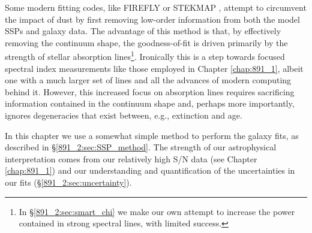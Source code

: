Some modern fitting codes, like FIREFLY \citep{Wilkinson15} or STEKMAP
\citep{Ocvirk06}, attempt to circumvent the impact of dust by first
removing low-order information from both the model SSPs and galaxy
data. The advantage of this method is that, by effectively removing
the continuum shape, the goodness-of-fit is driven primarily by the
strength of stellar absorption lines\footnote{ In
  \S\ref{891_2:sec:smart_chi} we make our own attempt to increase the
  power contained in strong spectral lines, with limited
  success.}. Ironically this is a step towards focused spectral index
measurements like those employed in Chapter \ref{chap:891_1}, albeit
one with a much larger set of lines and all the advances of modern
computing behind it. However, this increased focus on absorption lines
requires sacrificing information contained in the continuum shape and,
perhaps more importantly, ignores degeneracies that exist between,
e.g., extinction and age.

In this chapter we use a somewhat simple method to perform the galaxy
fits, as described in \S\ref{891_2:sec:SSP_method}. The strength of
our astrophysical interpretation comes from our relatively high S/N
data (see Chapter \ref{chap:891_1}) and our understanding and
quantification of the uncertainties in our fits
(\S\ref{891_2:sec:uncertainty}).




